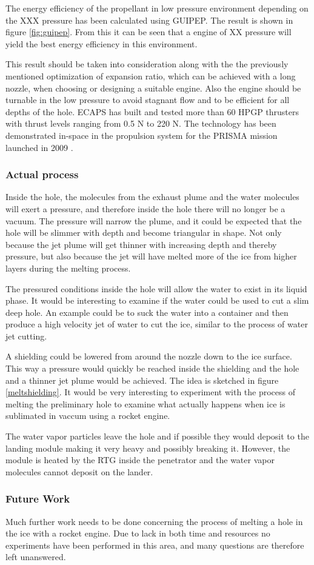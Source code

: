 The energy efficiency of the propellant in low pressure environment depending on the XXX pressure has been calculated using GUIPEP. The result is shown in figure \ref{fig:guipep}. From this it can be seen that a engine of XX pressure will yield the best energy efficiency in this environment. 

This result should be taken into consideration along with the the previously mentioned optimization of expansion ratio, which can be achieved with a long nozzle, when choosing or designing a suitable engine. Also the engine should be turnable in the low pressure to avoid stagnant flow and to be efficient for all depths of the hole. ECAPS has built and tested more than 60 HPGP thrusters with thrust levels ranging from 0.5 N to 220 N. The technology has been demonstrated in-space in the propulsion system for the PRISMA mission launched in 2009 \cite{Walter_2014}.

\subsubsection{Actual process}


Inside the hole, the molecules from the exhaust plume and the water molecules will exert a pressure, and therefore inside the hole there will no longer be a vacuum. The pressure will narrow the plume, and it could be expected that the hole will be slimmer with depth and become triangular in shape. Not only because the jet plume will get thinner with increasing depth and thereby pressure, but also because the jet will have melted more of the ice from higher layers during the melting process. 

The pressured conditions inside the hole will allow the water to exist in its liquid phase. It would be interesting to examine if the water could be used to cut a slim deep hole. An example could be to suck the water into a container and then produce a high velocity jet of water to cut the ice, similar to the process of water jet cutting. 

A shielding could be lowered from around the nozzle down to the ice surface. This way a pressure would quickly be reached inside the shielding and the hole and a thinner jet plume would be achieved. The idea is sketched in figure \ref{meltshielding}.
It would be very interesting to experiment with the process of melting the preliminary hole to examine what actually happens when ice is sublimated in vaccum using a rocket engine. 


The water vapor particles leave the hole and if possible they would deposit to the landing module making it very heavy and possibly breaking it. However, the module is heated by the RTG inside the penetrator and the water vapor molecules cannot deposit on the lander.

\subsubsection{Future Work}

Much further work needs to be done concerning the process of melting a hole in the ice with a rocket engine. Due to lack in both time and resources no experiments have been performed in this area, and many questions are therefore left unanswered. 
